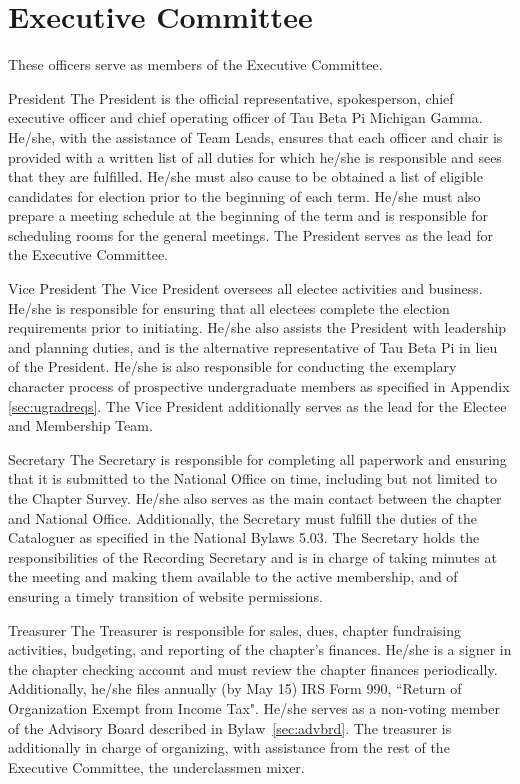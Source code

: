 \section{Executive Committee}\label{sec:ExecComm}
These officers serve as members of the Executive Committee.
\begin{enumsubsection}
\item{President} The President is the official representative, spokesperson, chief executive officer and chief operating officer of Tau Beta Pi Michigan Gamma. He/she, with the assistance of Team Leads, ensures that each officer and chair is provided with a written list of all duties for which he/she is responsible and sees that they are fulfilled.  He/she must also cause to be obtained a list of eligible candidates for election prior to the beginning of each term. He/she must also prepare a meeting schedule at the beginning of the term and is responsible for scheduling rooms for the general meetings. The President serves as the lead for the Executive Committee. 

\item{Vice President} The Vice President oversees all electee activities and business. He/she is responsible for ensuring that all electees complete the election requirements prior to initiating. He/she also assists the President with leadership and planning duties, and is the alternative representative of Tau Beta Pi in lieu of the President. He/she  is also responsible for conducting the exemplary character process of prospective undergraduate members as specified in Appendix \ref{sec:ugradreqs}. The Vice President additionally serves as the lead for the Electee and Membership Team.

\item{Secretary} The Secretary is responsible for completing all paperwork and ensuring that it is submitted to the National Office on time, including but not limited to the Chapter Survey. He/she also serves as the main contact between the chapter and National Office. Additionally, the Secretary must fulfill the duties of the Cataloguer as specified in the National Bylaws 5.03. The Secretary holds the responsibilities of the Recording Secretary and is in charge of taking minutes at the meeting and making them available to the active membership, and of ensuring a timely transition of website permissions.

\item{Treasurer} The Treasurer is responsible for sales, dues, chapter fundraising activities, budgeting, and reporting of the chapter's finances. He/she is a signer in the chapter checking account and must review the chapter finances periodically. Additionally, he/she files annually (by May 15) IRS Form 990, 
 ``Return of Organization Exempt from Income Tax".  He/she serves as a non-voting member of the Advisory Board described in Bylaw~\ref{sec:advbrd}. The treasurer is additionally in charge of organizing, with assistance from the rest of the Executive Committee, the underclassmen mixer.


\end{enumsubsection}
